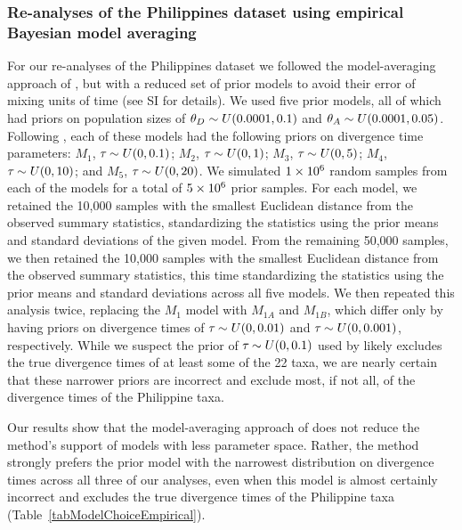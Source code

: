 \subsubsection{Re-analyses of the Philippines dataset using empirical Bayesian
model averaging}

For our re-analyses of the Philippines dataset we followed the model-averaging
approach of \citet{Hickerson2013}, but with a reduced set of prior models to
avoid their error of mixing units of time (see SI for details).
We used five prior models, all of which had priors on population sizes of
$\meanDescendantTheta{} \sim U(0.0001, 0.1)$ and $\ancestralTheta{} \sim
U(0.0001, 0.05)$.
Following \citet{Hickerson2013}, each of these models had the following
priors on divergence time parameters:
$M_1$, $\tau_{} \sim U(0, 0.1)$;
$M_2$, $\tau_{} \sim U(0, 1)$;
$M_3$, $\tau_{} \sim U(0, 5)$;
$M_4$, $\tau_{} \sim U(0, 10)$; and
$M_5$, $\tau_{} \sim U(0, 20)$.
We simulated $1\times 10^{6}$ random samples from each of the models for a total of
$5\times 10^{6}$ prior samples.
For each model, we retained the 10,000 samples with the smallest Euclidean
distance from the observed summary statistics, standardizing the statistics
using the prior means and standard deviations of the given model.
From the remaining 50,000 samples, we then retained the 10,000 samples with the
smallest Euclidean distance from the observed summary statistics, this time
standardizing the statistics using the prior means and standard deviations
across all five models.
We then repeated this analysis twice, replacing the $M_1$ model with
$M_{1A}$ and $M_{1B}$, which differ only by having priors on divergence
times of $\tau_{} \sim U(0, 0.01)$ and $\tau_{} \sim U(0, 0.001)$,
respectively.
While we suspect the prior of $\tau_{} \sim U(0, 0.1)$ used by
\citet{Hickerson2013} likely excludes the true divergence times of at least
some of the 22 taxa, we are nearly certain that these narrower priors are
incorrect and exclude most, if not all, of the divergence times of the
Philippine taxa.

Our results show that the model-averaging approach of \citet{Hickerson2013}
does not reduce the method's support of models with less parameter space.
Rather, the method strongly prefers the prior model with the narrowest
distribution on divergence times across all three of our analyses, even when
this model is almost certainly incorrect and excludes the true divergence times
of the Philippine taxa (Table~\ref{tabModelChoiceEmpirical}).


